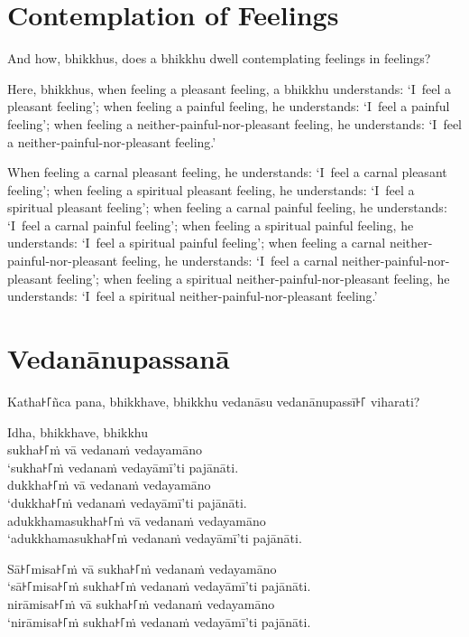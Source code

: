 

\englishPage
\chapter{Contemplation of Feelings}

And how, bhikkhus, does a bhikkhu dwell contemplating feelings in feelings?

Here, bhikkhus, when feeling a pleasant feeling, a bhikkhu understands:
`I~feel a pleasant feeling';
when feeling a painful feeling, he understands:
`I~feel a painful feeling';
when feeling a neither-painful-nor-pleasant feeling, he understands:
`I~feel a neither-painful-nor-pleasant feeling.'

When feeling a carnal pleasant feeling, he understands:
`I~feel a carnal pleasant feeling';
when feeling a spiritual pleasant feeling, he understands:
`I~feel a spiritual pleasant feeling';
when feeling a carnal painful feeling, he understands:
`I~feel a carnal painful feeling';
when feeling a spiritual painful feeling, he understands:
`I~feel a spiritual painful feeling';
when feeling a carnal neither-painful-nor-pleasant feeling, he understands:
`I~feel a carnal neither-painful-nor-pleasant feeling';
when feeling a spiritual neither-painful-nor-pleasant feeling, he understands:
`I~feel a spiritual neither-painful-nor-pleasant feeling.'

\paliPage
\chapter*{Vedanānupassanā}

Katha꜔꜒ñca pana, bhikkhave, bhikkhu vedanāsu vedanānupassī꜔꜒ viharati?

Idha, bhikkhave, bhikkhu\\
sukha꜔꜒ṁ vā vedanaṁ vedayamāno\\
‘sukha꜔꜒ṁ vedanaṁ vedayāmī’ti pajānāti.\\
dukkha꜔꜒ṁ vā vedanaṁ vedayamāno\\
‘dukkha꜔꜒ṁ vedanaṁ vedayāmī’ti pajānāti.\\
adukkhamasukha꜔꜒ṁ vā vedanaṁ vedayamāno\\
‘adukkhamasukha꜔꜒ṁ vedanaṁ vedayāmī’ti pajānāti.

Sā꜔꜒misa꜔꜒ṁ vā sukha꜔꜒ṁ vedanaṁ vedayamāno\\
‘sā꜔꜒misa꜔꜒ṁ sukha꜔꜒ṁ vedanaṁ vedayāmī’ti pajānāti.\\
nirāmisa꜔꜒ṁ vā sukha꜔꜒ṁ vedanaṁ vedayamāno\\
‘nirāmisa꜔꜒ṁ sukha꜔꜒ṁ vedanaṁ vedayāmī’ti pajānāti.

